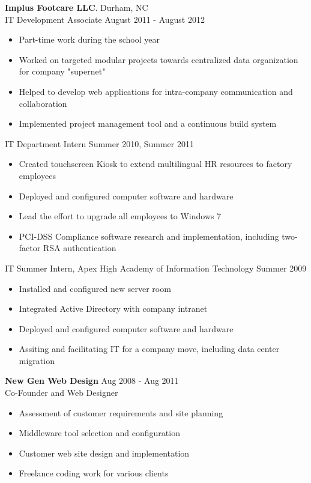 \documentclass[margin]{res}
\begin{document}
\begin{resume}
{\textbf{Implus Footcare LLC}. Durham, NC}  \\
	IT Development Associate \hfill August 2011 - August 2012
	\begin{itemize} \itemsep -2pt %
	\item Part-time work during the school year
	\item Worked on targeted modular projects towards centralized data organization for company "supernet"
	\item Helped to develop web applications for intra-company communication and collaboration
	 \item Implemented project management tool and a continuous build system
	\end{itemize}
                IT Department Intern \hfill Summer 2010, Summer 2011
                 \begin{itemize}  \itemsep -2pt %
	     \item Created touchscreen Kiosk to extend multilingual HR resources to factory employees
	      \item Deployed and configured computer software and hardware
	     \item Lead the effort to upgrade all employees to Windows 7
	     \item PCI-DSS Compliance software research and implementation, including two-factor RSA authentication
                 \end{itemize}
                IT Summer Intern, Apex High Academy of Information Technology
	    \hfill Summer 2009
                 \begin{itemize}  \itemsep -2pt %
                 \item Installed and configured new server room
	      \item Integrated Active Directory with company intranet
	      \item Deployed and configured computer software and hardware
	      \item Assiting and facilitating IT for a company move, including data center migration
                 \end{itemize}
{\textbf{New Gen Web Design}} \hfill Aug 2008 - Aug 2011 \\
                Co-Founder and Web Designer
                 \begin{itemize}  \itemsep -2pt %
                 \item Assessment of customer requirements and site planning
                \item  Middleware tool selection and configuration
	     \item Customer web site design and implementation
	      \item Freelance coding work for various clients
                \end{itemize}
	

\end{resume}
\end{document}
